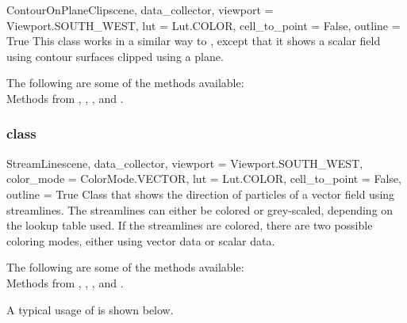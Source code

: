 \begin{classdesc}{ContourOnPlaneClip}{scene, data_collector, 
viewport = Viewport.SOUTH_WEST, lut = Lut.COLOR, cell_to_point = False, 
outline = True}
This class works in a similar way to \MapOnPlaneClip, except that it shows a 
scalar field using contour surfaces clipped using a plane.
\end{classdesc}

The following are some of the methods available:\\
Methods from \ActorThreeD, \ContourModule, \Transform, \Clipper and 
\DataSetMapper. 

\subsubsection{\StreamLine class}

\begin{classdesc}{StreamLine}{scene, data_collector,
viewport = Viewport.SOUTH_WEST, color_mode = ColorMode.VECTOR, lut = Lut.COLOR,
cell_to_point = False, outline = True}
Class that shows the direction of particles of a vector field using streamlines.
The streamlines can either be colored or grey-scaled, depending on the lookup
table used. If the streamlines are colored, there are two possible coloring 
modes, either using vector data or scalar data.
\end{classdesc}

The following are some of the methods available:\\
Methods from \ActorThreeD, \PointSource, \StreamLineModule, \Tube and 
\DataSetMapper. 

A typical usage of \StreamLine is shown below.


